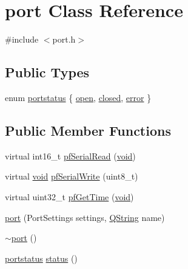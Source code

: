 \hypertarget{classport}{\section{port \-Class \-Reference}
\label{classport}
}


{\ttfamily \#include $<$port.\-h$>$}

\subsection*{\-Public \-Types}
\begin{DoxyCompactItemize}
\item 
enum \hyperlink{group___uploader_ga2f8ecb3d9778a986988296b474912ad3}{portstatus} \{ \hyperlink{group___uploader_gga2f8ecb3d9778a986988296b474912ad3aa27283d847e32c8004f5f4793f0a9704}{open}, 
\hyperlink{group___uploader_gga2f8ecb3d9778a986988296b474912ad3a5d09f03f25366db4d621110f6d3e48fa}{closed}, 
\hyperlink{group___uploader_gga2f8ecb3d9778a986988296b474912ad3a5a170de7334d016eb4a494cb60943a46}{error}
 \}
\end{DoxyCompactItemize}
\subsection*{\-Public \-Member \-Functions}
\begin{DoxyCompactItemize}
\item 
virtual int16\-\_\-t \hyperlink{group___uploader_gae97ecc8aa7bff549fc95c2fe0c922279}{pf\-Serial\-Read} (\hyperlink{group___u_a_v_objects_plugin_ga444cf2ff3f0ecbe028adce838d373f5c}{void})
\item 
virtual \hyperlink{group___u_a_v_objects_plugin_ga444cf2ff3f0ecbe028adce838d373f5c}{void} \hyperlink{group___uploader_ga30e501e90b5d17c51d6f26ff169cf03d}{pf\-Serial\-Write} (uint8\-\_\-t)
\item 
virtual uint32\-\_\-t \hyperlink{group___uploader_ga175fa612d12b3411709d60fef9c26cc2}{pf\-Get\-Time} (\hyperlink{group___u_a_v_objects_plugin_ga444cf2ff3f0ecbe028adce838d373f5c}{void})
\item 
\hyperlink{group___uploader_ga07c31ea30e7226e74f05a64bf51e89c8}{port} (\-Port\-Settings settings, \hyperlink{group___u_a_v_objects_plugin_gab9d252f49c333c94a72f97ce3105a32d}{\-Q\-String} name)
\item 
\hyperlink{group___uploader_gacd903c84068e3b7829d0688ae4aad58e}{$\sim$port} ()
\item 
\hyperlink{group___uploader_ga2f8ecb3d9778a986988296b474912ad3}{portstatus} \hyperlink{group___uploader_ga047435f44b40228c4e544c28bd77f03b}{status} ()
\end{DoxyCompactItemize}
